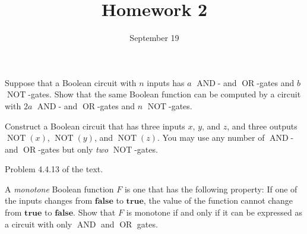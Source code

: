 \documentclass{../math167}
\title{Homework 2}
\date{September 19}
\author{}
\newcommand{\NOT}{\operatorname{NOT}}
\newcommand{\AND}{\operatorname{AND}}
\newcommand{\OR}{\operatorname{OR}}
\begin{document}
\begin{problems}
\item Suppose that a Boolean circuit with \(n\) inputs has \(a\)
  \(\AND\)- and \(\OR\)-gates and \(b\) \(\NOT\)-gates.  Show that the
  same Boolean function can be computed by a circuit with \(2a\)
  \(\AND\)- and \(\OR\)-gates and \(n\) \(\NOT\)-gates.

\item Construct a Boolean circuit that has three inputs \(x\), \(y\),
  and \(z\), and three outputs \(\NOT(x)\), \(\NOT(y)\), and
  \(\NOT(z)\).  You may use any number of \(\AND\)- and \(\OR\)-gates
  but only \emph{two} \(\NOT\)-gates.

\item Problem 4.4.13 of the text.
  \begin{book}
    A \emph{monotone} Boolean function \(F\) is one that has the
    following property: If one of the inputs changes from
    \(\mathbf{false}\) to \(\mathbf{true}\), the value of the function
    cannot change from \(\mathbf{true}\) to \(\mathbf{false}\).  Show
    that \(F\) is monotone if and only if it can be expressed as a
    circuit with only \(\AND\) and \(\OR\) gates.
  \end{book}
\end{problems}
\end{document}

